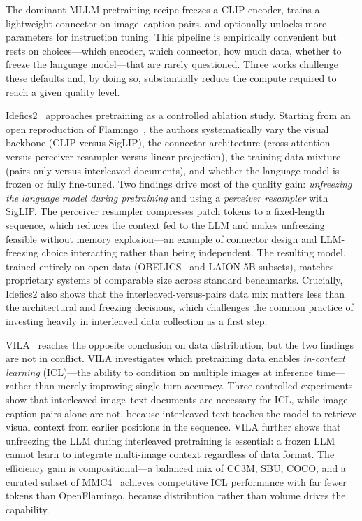 The dominant MLLM pretraining recipe freezes a CLIP encoder, trains a lightweight connector on image--caption pairs, and optionally unlocks more parameters for instruction tuning. This pipeline is empirically convenient but rests on choices---which encoder, which connector, how much data, whether to freeze the language model---that are rarely questioned. Three works challenge these defaults and, by doing so, substantially reduce the compute required to reach a given quality level.

Idefics2~\cite{Laurençon202402246} approaches pretraining as a controlled ablation study. Starting from an open reproduction of Flamingo~\cite{Alayrac202204228}, the authors systematically vary the visual backbone (CLIP versus SigLIP), the connector architecture (cross-attention versus perceiver resampler versus linear projection), the training data mixture (pairs only versus interleaved documents), and whether the language model is frozen or fully fine-tuned. Two findings drive most of the quality gain: \emph{unfreezing the language model during pretraining} and using a \emph{perceiver resampler} with SigLIP. The perceiver resampler compresses patch tokens to a fixed-length sequence, which reduces the context fed to the LLM and makes unfreezing feasible without memory explosion---an example of connector design and LLM-freezing choice interacting rather than being independent. The resulting model, trained entirely on open data (OBELICS~\cite{Laurençon202309462} and LAION-5B subsets), matches proprietary systems of comparable size across standard benchmarks. Crucially, Idefics2 also shows that the interleaved-versus-pairs data mix matters less than the architectural and freezing decisions, which challenges the common practice of investing heavily in interleaved data collection as a first step.

VILA~\cite{Lin202312533} reaches the opposite conclusion on data distribution, but the two findings are not in conflict. VILA investigates which pretraining data enables \emph{in-context learning} (ICL)---the ability to condition on multiple images at inference time---rather than merely improving single-turn accuracy. Three controlled experiments show that interleaved image--text documents are necessary for ICL, while image--caption pairs alone are not, because interleaved text teaches the model to retrieve visual context from earlier positions in the sequence. VILA further shows that unfreezing the LLM during interleaved pretraining is essential: a frozen LLM cannot learn to integrate multi-image context regardless of data format. The efficiency gain is compositional---a balanced mix of CC3M, SBU, COCO, and a curated subset of MMC4~\cite{Zhu202304341} achieves competitive ICL performance with far fewer tokens than OpenFlamingo, because distribution rather than volume drives the capability.

